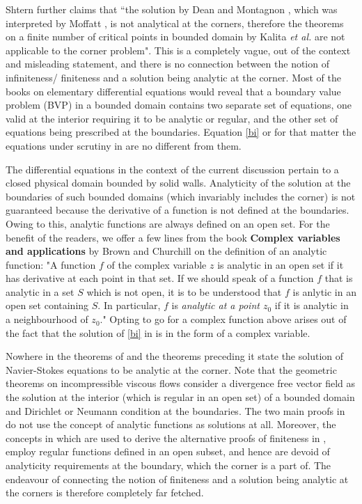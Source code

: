 Shtern \cite{sh18} further claims that ``the solution by Dean and Montagnon \cite{dean}, which was interpreted by Moffatt \cite{moff2}, is not analytical at the corners, therefore the theorems on a finite number of critical points in bounded domain by Kalita {\it et al.} \cite{kal18} are not applicable to the corner problem". This is a completely vague, out of the context and misleading statement, and there is no connection between the notion of infiniteness/ finiteness and a solution being analytic at the corner. Most of the books on elementary differential equations \cite{sne,john,zan,chil} would reveal that a boundary value problem (BVP) in a bounded domain contains two separate set of equations, one valid at the interior requiring it to be analytic or regular, and the other set of equations being prescribed at the boundaries. Equation \eqref{bi} or for that matter the equations under scrutiny in \cite{kal18,bakker,delery,ghil,hir,wang,wu}  are no different from them.

The differential equations in the context of the current discussion pertain to a closed physical domain bounded by solid walls. Analyticity of the solution at the boundaries of such bounded domains (which invariably includes the corner) is not guaranteed because the derivative of a function is not defined at the boundaries. Owing to this, analytic functions are always defined on an open set. 
For the benefit of the readers, we offer a few lines from the book {\bf Complex variables and applications} by Brown and Churchill \cite{bro} on the definition of an analytic function: "A function $f$ of the complex variable $z$ is analytic in an open set if it has derivative at each point in that set. If we should speak of a function $f$ that is analytic in a set $S$ which is not open, it is to be understood that $f$ is anlytic in an open set containing $S$. In particular, $f$ is {\it analytic at a point $z_0$} if it is analytic in a neighbourhood of $z_0$." Opting to go for a complex function above arises out of the fact that the solution of \eqref{bi} in \cite{sh18,dean,moff2} is in the form of a complex variable.

Nowhere in the theorems of \cite{kal18} and the theorems preceding it \cite{bakker,delery,ghil,hir,wang,wu} state the solution of  Navier-Stokes equations to be analytic at the corner. Note that the geometric theorems on incompressible viscous flows \cite{ghil,wang} consider a divergence free vector field as the solution at the interior (which is regular in an open set) of a bounded domain and Dirichlet or Neumann condition at the boundaries. The two main proofs in \cite{kal18} do not use the concept of analytic functions as solutions at all. Moreover, the concepts in \cite{bakker,delery,ghil,hir,wang,wu} which are used to derive the alternative proofs of finiteness in \cite{kal18}, employ regular functions defined in an open subset, and hence are devoid of analyticity requirements at the boundary, which the corner is a part of. The endeavour of connecting the notion of finiteness and a solution being analytic at the corners is therefore completely far fetched.

